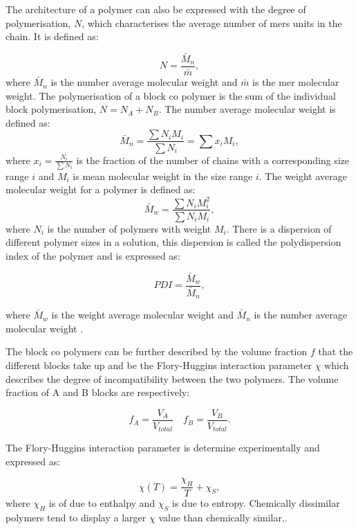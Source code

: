 \documentclass[MasterThesisMain.tex]{subfiles}
\begin{document}
The architecture of a polymer can also be expressed with the degree of polymerisation, $N$, which characterises the average number of mers units in the chain. It is defined as:

\begin{equation}
N = \frac{\bar{M}_n}{\bar{m}},
\end{equation}
where $\bar{M}_n$ is the number average molecular weight and $\bar{m}$ is the mer molecular weight. The polymerisation of a block co polymer is the sum of the individual block polymerisation, $N = N_A + N_B$. The number average molecular weight is defined as:
\begin{equation}
\bar{M}_n = \frac{\sum N_iM_i}{\sum N_i} = \sum x_iM_i,
\end{equation}      
where $x_i = \frac{N_i}{\sum N_i}$ is the fraction of the number of chains with a corresponding size range $i$ and $M_i$ is mean molecular weight in the size range $i$. The weight average molecular weight for a polymer is defined as:
\begin{equation}
\bar{M}_w=\frac{\sum N_iM_i^2}{\sum N_iM_i},
\end{equation}
where $N_i$ is the number of polymers with weight $M_i$. There is a dispersion of different polymer sizes in a solution, this dispersion is called the polydispersion index of the polymer and is expressed as:

\begin{equation}
PDI = \frac{\bar{M}_w}{\bar{M}_n},
\end{equation} 

where $\bar{M}_w$ is the weight average molecular weight and $\bar{M}_n$ is the number average molecular weight \cite{strobl2007physics}.

The block co polymers can be further described by the volume fraction $f$ that the different blocks take up and be the Flory-Huggins interaction parameter $\chi$ which describes the degree of incompatibility between the two polymers. The volume fraction of A and B blocks are respectively:

\begin{equation}
f_A = \frac{V_A}{V_{total}} \quad f_B=\frac{V_B}{V_{total}}.
\end{equation}

The Flory-Huggins interaction parameter is determine experimentally and expressed as:

\begin{equation}
\chi(T) = \frac{\chi_H}{T} + \chi_S,
\end{equation} 
where $\chi_H$ is of due to enthalpy and $\chi_S$ is due to entropy. Chemically dissimilar polymers tend to display a larger $\chi$ value than chemically similar,\cite{BCPthermo}\cite{FHpolymer}.
\end{document}
